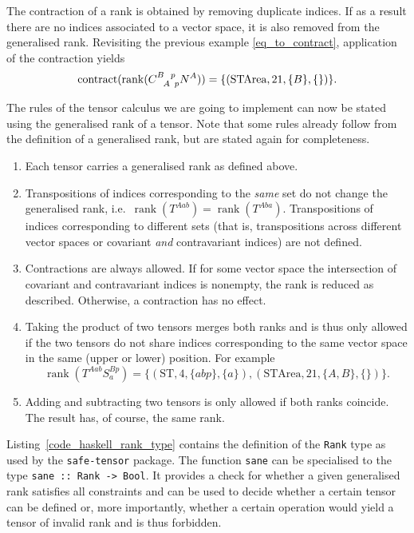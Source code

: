 The contraction of a rank is obtained by removing duplicate indices. If as a result there are no indices associated to a vector space, it is also removed from the generalised rank. Revisiting the previous example \eqref{eq_to_contract}, application of the contraction yields
\begin{equation}
  \operatorname{contract}(\operatorname{rank}(\gmc{B}{A}{p}{p} N^A)) = \{(\text{STArea}, 21, \{B\}, \{\})\}.
\end{equation}

The rules of the tensor calculus we are going to implement can now be stated using the generalised rank of a tensor. Note that some rules already follow from the definition of a generalised rank, but are stated again for completeness.
\begin{enumerate}
  \item Each tensor carries a generalised rank as defined above.
  \item Transpositions of indices corresponding to the \emph{same} set do not change the generalised rank, i.e.\ $\operatorname{rank}(T^{Aab}) = \operatorname{rank}(T^{Aba})$. Transpositions of indices corresponding to different sets (that is, transpositions across different vector spaces or covariant \emph{and} contravariant indices) are not defined.
  \item Contractions are always allowed. If for some vector space the intersection of covariant and contravariant indices is nonempty, the rank is reduced as described. Otherwise, a contraction has no effect.
  \item Taking the product of two tensors merges both ranks and is thus only allowed if the two tensors do not share indices corresponding to the same vector space in the same (upper or lower) position. For example
    \begin{equation}
      \operatorname{rank}(T^{Aab} S^{Bp}_{a}) = \{(\text{ST}, 4, \{abp\}, \{a\}), (\text{STArea}, 21, \{A,B\}, \{\})\}.
    \end{equation}
  \item Adding and subtracting two tensors is only allowed if both ranks coincide. The result has, of course, the same rank.
\end{enumerate}

Listing~\ref{code_haskell_rank_type} contains the definition of the \texttt{Rank} type as used by the \texttt{safe-tensor} package. The function \texttt{sane} can be specialised to the type \texttt{sane :: Rank -> Bool}. It provides a check for whether a given generalised rank satisfies all constraints and can be used to decide whether a certain tensor can be defined or, more importantly, whether a certain operation would yield a tensor of invalid rank and is thus forbidden.

